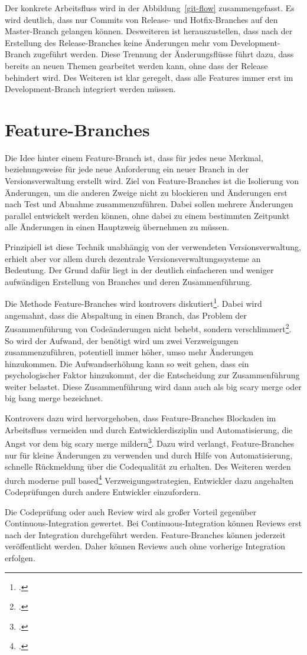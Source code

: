 Der konkrete Arbeitsfluss wird in der Abbildung~\ref{git-flow} zusammengefasst. Es wird deutlich, dass nur Commits von 
Release- und Hotfix-Branches auf den Master-Branch gelangen können. Desweiteren ist herauszustellen, dass nach der 
Erstellung des Release-Branches keine Änderungen mehr vom Development-Branch zugeführt werden. Diese Trennung der 
Änderungsflüsse führt dazu, dass bereits an neuen Themen gearbeitet werden kann, ohne dass der Release behindert wird. 
Des Weiteren ist klar geregelt, dass alle Features immer erst im Development-Branch integriert werden müssen.

\section{Feature-Branches}
\label{sec:feature-branches}
Die Idee hinter einem Feature-Branch ist, dass für jedes neue Merkmal, beziehungsweise für jede neue Anforderung ein neuer Branch in der Versionsverwaltung erstellt wird. Ziel von Feature-Branches ist die Isolierung von Änderungen, um die anderen Zweige nicht zu blockieren und Änderungen erst nach Test und Abnahme zusammenzuführen. Dabei sollen mehrere Änderungen parallel entwickelt werden können, ohne dabei zu einem bestimmten Zeitpunkt alle Änderungen in einen Hauptzweig übernehmen zu müssen.

Prinzipiell ist diese Technik unabhängig von der verwendeten Versionsverwaltung, erhielt aber vor allem durch dezentrale Versionsverwaltungssysteme an Bedeutung. Der Grund dafür liegt in der deutlich einfacheren und weniger aufwändigen Erstellung von Branches und deren Zusammenführung.

Die Methode Feature-Branches wird kontrovers diskutiert\footcite[vgl.][]{fb-revisited}. 
Dabei wird angemahnt, dass die Abspaltung in einen Branch, das Problem der Zusammenführung von Codeänderungen nicht behebt, sondern verschlimmert\footcite[vgl.][]{fowler-feature-branch}. So wird der Aufwand, der benötigt wird um zwei Verzweigungen zusammenzuführen, potentiell immer höher, umso mehr Änderungen hinzukommen. Die Aufwandserhöhung kann so weit gehen, dass ein psychologischer Faktor 
hinzukommt, der die Entscheidung zur Zusammenführung weiter belastet. Diese Zusammenführung wird dann auch als \glqq big scary merge\grqq{} oder \glqq big bang merge\grqq{} bezeichnet.

Kontrovers dazu wird hervorgehoben, dass Feature-Branches Blockaden im Arbeitsfluss vermeiden und durch Entwicklerdisziplin und Automatisierung, die Angst vor dem \glqq big scary merge\grqq{} mildern\footcite[vgl.][]{ci-is-dead}. Dazu wird verlangt, Feature-Branches nur für kleine Änderungen zu verwenden und durch Hilfe von Automatisierung, schnelle Rückmeldung über die Codequalität zu erhalten. Des Weiteren werden durch moderne \glqq pull based\grqq{}\footcite[vgl.][]{github-about-pull} Verzweigungsstrategien, Entwickler dazu angehalten Codeprüfungen durch andere Entwickler einzufordern. 

Die Codeprüfung oder auch Review wird als großer Vorteil gegenüber Continuous-Integration gewertet. Bei Continuous-Integration können Reviews erst nach der Integration durchgeführt werden. Feature-Branches können jederzeit veröffentlicht werden. Daher können Reviews auch ohne vorherige Integration erfolgen. 
